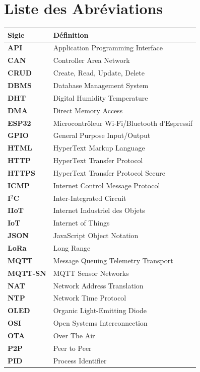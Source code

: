 \chapter*{Liste des Abr\'eviations}

\begin{table}[htbp]
\centering
\renewcommand{\arraystretch}{1.3}
\begin{tabular}{>{\bfseries}l l}
\toprule
\textbf{Sigle} & \textbf{D\'efinition} \\
\midrule
API & Application Programming Interface \\
CAN & Controller Area Network \\
CRUD & Create, Read, Update, Delete \\
DBMS & Database Management System \\
DHT & Digital Humidity Temperature \\
DMA & Direct Memory Access \\
ESP32 & Microcontr\^oleur Wi-Fi/Bluetooth d'Espressif \\
GPIO & General Purpose Input/Output \\
HTML & HyperText Markup Language \\
HTTP & HyperText Transfer Protocol \\
HTTPS & HyperText Transfer Protocol Secure \\
ICMP & Internet Control Message Protocol \\
I$^2$C & Inter-Integrated Circuit \\
IIoT & Internet Industriel des Objets \\
IoT & Internet of Things \\
JSON & JavaScript Object Notation \\
LoRa & Long Range \\
MQTT & Message Queuing Telemetry Transport \\
MQTT-SN & MQTT Sensor Networks \\
NAT & Network Address Translation \\
NTP & Network Time Protocol \\
OLED & Organic Light-Emitting Diode \\
OSI & Open Systems Interconnection \\
OTA & Over The Air \\
P2P & Peer to Peer \\
PID & Process Identifier \\

\end{tabular}
\end{table}
